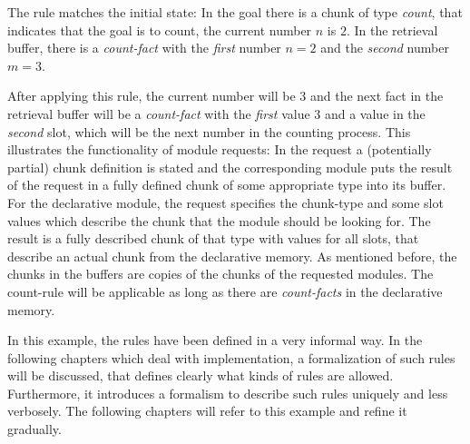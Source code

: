 \begin{center}
\end{center}

The rule matches the initial state: In the goal there is a chunk of type \emph{count}, that indicates that the goal is to count, the current number $n$ is $2$. In the retrieval buffer, there is a \emph{count-fact} with the \emph{first} number $n = 2$ and the \emph{second} number $m = 3$. 

After applying this rule, the current number will be $3$ and the next fact in the retrieval buffer will be a \emph{count-fact} with the \emph{first} value $3$ and a value in the \emph{second} slot, which will be the next number in the counting process. This illustrates the functionality of module requests: In the request a (potentially partial) chunk definition is stated and the corresponding module puts the result of the request in a fully defined chunk of some appropriate type into its buffer. For the declarative module, the request specifies the chunk-type and some slot values which describe the chunk that the module should be looking for. The result is a fully described chunk of that type with values for all slots, that describe an actual chunk from the declarative memory. As mentioned before, the chunks in the buffers are copies of the chunks of the requested modules. The count-rule will be applicable as long as there are \emph{count-facts} in the declarative memory. %

In this example, the rules have been defined in a very informal way. In the following chapters which deal with implementation, a formalization of such rules will be discussed, that defines clearly what kinds of rules are allowed. Furthermore, it introduces a formalism to describe such rules uniquely and less verbosely. The following chapters will refer to this example and refine it gradually.

